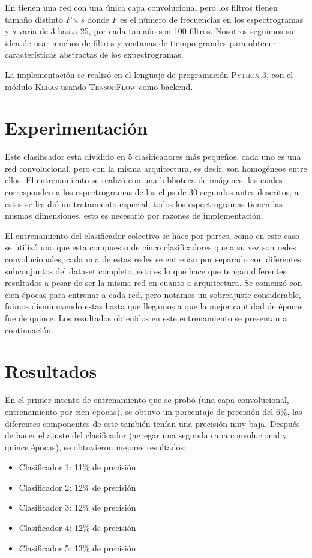 \documentclass[spanish,11pt,letterpaper]{article}
\begin{document}
En \cite{audio_recognition} tienen una red con una única
capa convolucional pero los filtros tienen tamaño distinto $F \times s$ donde
$F$ es el número de frecuencias en los espectrogramas y $s$ varía de 3 hasta 25,
por cada tamaño son 100 filtros. Nosotros seguimos su idea de usar muchos
de filtros y ventanas de tiempo grandes para obtener características abstractas
de los expectrogramas.

La implementación se realizó en el lenguaje de programación \textsc{Python 3},
con el módulo \textsc{Keras} usando \textsc{TensorFlow} como backend.

\section{Experimentación}

Este clasificador esta dividido en 5 clasificadores más pequeños, cada uno es una red convolucional, pero con la
misma arquitectura, es decir, son homogéneos entre ellos. El entrenamiento se realizó con una biblioteca de
imágenes, las cuales corresponden a los espectrogramas de los clips de 30 segundos antes descritos, a estos se les
dió un tratamiento especial, todos los espectrogramas tienen las mismas dimensiones, esto es necesario por razones
de implementación.

El entrenamiento del clasificador colectivo se hace por partes, como en este caso se utilizó uno que esta
compuesto de cinco clasificadores que a su vez son redes convolucionales, cada una de estas redes se entrenan por
separado con diferentes subconjuntos del dataset completo, esto es lo que hace que tengan diferentes resultados a
pesar de ser la misma red en cuanto a arquitectura. Se comenzó con cien épocas para entrenar a cada red, pero
notamos un sobreajuste considerable, fuimos disminuyendo estas hasta que llegamos a que la mejor cantidad de
épocas fue de quince. Los resultados obtenidos en este entrenamiento se presentan a continuación.

\section{Resultados}

En el primer intento de entrenamiento que se probó (una capa convolucional, entrenamiento por cien épocas), se obtuvo un porcentaje de precisión del 6\%, las diferentes componentes de este también tenían una precisión muy baja. Después de hacer el ajuste del clasificador (agregar una segunda capa convolucional y quince épocas), se obtuvieron mejores resultados:
\begin{itemize}
\item Clasificador 1: 11\% de precisión
\item Clasificador 2: 12\% de precisión
\item Clasificador 3: 12\% de precisión
\item Clasificador 4: 12\% de precisión
\item Clasificador 5: 13\% de precisión
\end{itemize}
\end{document}
